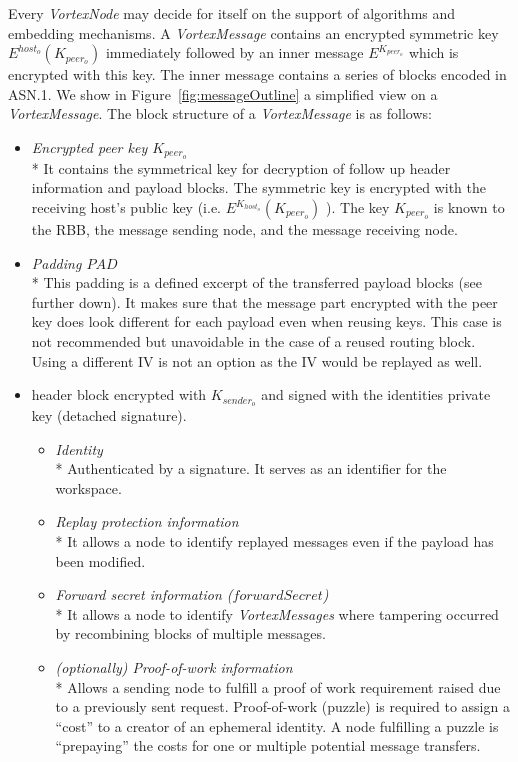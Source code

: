 \documentclass[acmsmall, screen]{acmart}
\begin{document}
Every \emph{VortexNode} may decide for itself on the support of algorithms and embedding mechanisms. A \emph{VortexMessage} contains an encrypted symmetric key $E^{host_o}\left(K_{peer_o}\right)$ immediately followed by an inner message $E^{K_{peer_o}}$ which is encrypted with this key. The inner message contains a series of blocks encoded in ASN.1. We show in Figure~\ref{fig:messageOutline} a simplified view on a \emph{VortexMessage}. The block structure of a \emph{VortexMessage} is as follows:
\begin{itemize}
	\item \emph{Encrypted peer key $K_{peer_o}$}\\*
	It contains the symmetrical key for decryption of follow up header information and payload blocks. The symmetric key is encrypted with the receiving host's public key (i.e. $E^{K_{host_o}}\left(K_{peer_o}\right)$ ). The key $K_{peer_o}$ is known to the RBB, the message sending node, and the message receiving node.
	\item \emph{Padding $PAD$}\\*
	This padding is a defined excerpt of the transferred payload blocks (see further down). It makes sure that the message part encrypted with the peer key does look different for each payload even when reusing keys. This case is not recommended but unavoidable in the case of a reused routing block. Using a different IV is not an option as the IV would be replayed as well.
	\item header block encrypted with $K_{sender_o}$ and signed with the identities private key (detached signature).
	\begin{itemize}
		\item \emph{Identity}\\*
		Authenticated by a signature. It serves as an identifier for the workspace.
		\item \emph{Replay protection information}\\*
		It allows a node to identify replayed messages even if the payload has been modified.
		\item \emph{Forward secret information ($forwardSecret$)}\\*
		It allows a node to identify \emph{VortexMessages} where tampering occurred by recombining blocks of multiple messages.      
		\item \emph{(optionally) Proof-of-work information}\\*
		Allows a sending node to fulfill a proof of work requirement raised due to a previously sent request. Proof-of-work (puzzle) is required to assign a ``cost'' to a creator of an ephemeral identity. A node fulfilling a puzzle is ``prepaying'' the costs for one or multiple potential message transfers. 

\end{itemize}
\end{itemize}
\end{document}
